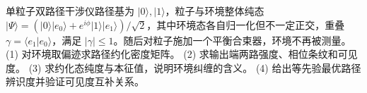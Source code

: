 单粒子双路径干涉仪路径基为 \(|0\rangle,|1\rangle\)，粒子与环境整体纯态 \(|\Psi\rangle=(|0\rangle|e_0\rangle+e^{i\phi}|1\rangle|e_1\rangle)/\sqrt2\)，其中环境态各自归一化但不一定正交，重叠 \(\gamma=\langle e_1|e_0\rangle\)，满足 \(|\gamma|\le1\)。随后对粒子施加一个平衡合束器，环境不再被测量。
(1) 对环境取偏迹求路径约化密度矩阵。
(2) 求输出端两路强度、相位条纹和可见度。
(3) 求约化态纯度与本征值，说明环境纠缠的含义。
(4) 给出等先验最优路径辨识度并验证可见度互补关系。
